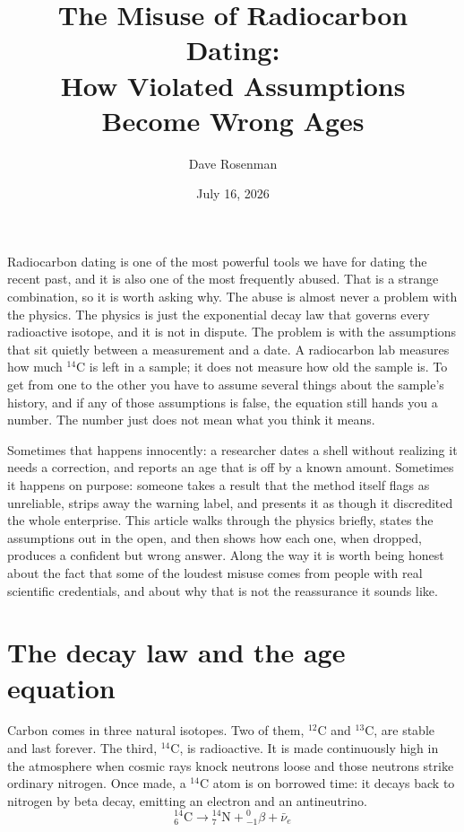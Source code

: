 \documentclass[11pt]{article}
\title{The Misuse of Radiocarbon Dating:\\ How Violated Assumptions Become Wrong Ages}
\author{Dave Rosenman}
\date{July 16, 2026}
\begin{document}
\maketitle

Radiocarbon dating is one of the most powerful tools we have for dating the recent past, and it is also one of the most frequently abused. That is a strange combination, so it is worth asking why. The abuse is almost never a problem with the physics. The physics is just the exponential decay law that governs every radioactive isotope, and it is not in dispute. The problem is with the assumptions that sit quietly between a measurement and a date. A radiocarbon lab measures how much $^{14}\mathrm{C}$ is left in a sample; it does not measure how old the sample is. To get from one to the other you have to assume several things about the sample's history, and if any of those assumptions is false, the equation still hands you a number. The number just does not mean what you think it means.

Sometimes that happens innocently: a researcher dates a shell without realizing it needs a correction, and reports an age that is off by a known amount. Sometimes it happens on purpose: someone takes a result that the method itself flags as unreliable, strips away the warning label, and presents it as though it discredited the whole enterprise. This article walks through the physics briefly, states the assumptions out in the open, and then shows how each one, when dropped, produces a confident but wrong answer. Along the way it is worth being honest about the fact that some of the loudest misuse comes from people with real scientific credentials, and about why that is not the reassurance it sounds like.

\section*{The decay law and the age equation}

Carbon comes in three natural isotopes. Two of them, $^{12}\mathrm{C}$ and $^{13}\mathrm{C}$, are stable and last forever. The third, $^{14}\mathrm{C}$, is radioactive. It is made continuously high in the atmosphere when cosmic rays knock neutrons loose and those neutrons strike ordinary nitrogen. Once made, a $^{14}\mathrm{C}$ atom is on borrowed time: it decays back to nitrogen by beta decay, emitting an electron and an antineutrino.
\[
{}^{14}_{6}\mathrm{C}
\rightarrow
{}^{14}_{7}\mathrm{N}
+
{}^{0}_{-1}\beta
+
\bar{\nu}_e
\]
\end{document}
